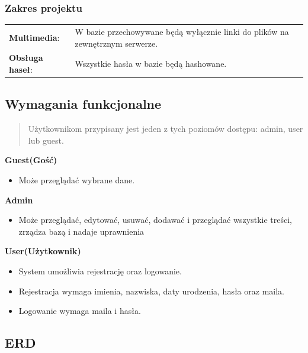 \documentclass{article}
\begin{document}
\subsubsection{Zakres projektu}

\begin{tabular}{@{} l p{10cm} @{}}
    \textbf{Multimedia}:    & W bazie przechowywane będą wyłącznie linki do plików na zewnętrznym serwerze. \\
    \textbf{Obsługa haseł}: & Wszystkie hasła w bazie będą hashowane.
\end{tabular}


\subsection{Wymagania funkcjonalne}

\begin{abstract}
    Użytkownikom przypisany jest jeden z tych poziomów dostępu: admin, user lub guest.
\end{abstract}

\textbf{Guest(Gość)}

\begin{itemize}
    \item Może przeglądać wybrane dane.
\end{itemize}

\textbf{Admin}

\begin{itemize}
    \item Może przeglądać, edytować, usuwać, dodawać i przeglądać wszystkie treści, zrządza bazą i nadaje uprawnienia
\end{itemize}

\textbf{User(Użytkownik)}

\begin{itemize}
    \item System umożliwia rejestrację oraz logowanie.
    \item Rejestracja wymaga imienia, nazwiska, daty urodzenia, hasła oraz maila.
    \item Logowanie wymaga maila i hasła.
\end{itemize}


\subsection{ERD}
\end{document}
